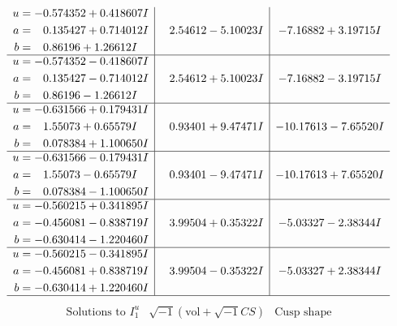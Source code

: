 \documentclass[1p]{elsarticle_modified}
\theoremstyle{definition}
\newcommand{\I}{\sqrt{-1}}
\begin{document}
$$\begin{array}{c|c|c}
\begin{aligned}
u &= -0.574352 + 0.418607 I \\
a &= \phantom{-}0.135427 + 0.714012 I \\
b &= \phantom{-}0.86196 + 1.26612 I\end{aligned}
 & \phantom{-}2.54612 - 5.10023 I & -7.16882 + 3.19715 I \\ \hline\begin{aligned}
u &= -0.574352 - 0.418607 I \\
a &= \phantom{-}0.135427 - 0.714012 I \\
b &= \phantom{-}0.86196 - 1.26612 I\end{aligned}
 & \phantom{-}2.54612 + 5.10023 I & -7.16882 - 3.19715 I \\ \hline\begin{aligned}
u &= -0.631566 + 0.179431 I \\
a &= \phantom{-}1.55073 + 0.65579 I \\
b &= \phantom{-}0.078384 + 1.100650 I\end{aligned}
 & \phantom{-}0.93401 + 9.47471 I & -10.17613 - 7.65520 I \\ \hline\begin{aligned}
u &= -0.631566 - 0.179431 I \\
a &= \phantom{-}1.55073 - 0.65579 I \\
b &= \phantom{-}0.078384 - 1.100650 I\end{aligned}
 & \phantom{-}0.93401 - 9.47471 I & -10.17613 + 7.65520 I \\ \hline\begin{aligned}
u &= -0.560215 + 0.341895 I \\
a &= -0.456081 - 0.838719 I \\
b &= -0.630414 - 1.220460 I\end{aligned}
 & \phantom{-}3.99504 + 0.35322 I & -5.03327 - 2.38344 I \\ \hline\begin{aligned}
u &= -0.560215 - 0.341895 I \\
a &= -0.456081 + 0.838719 I \\
b &= -0.630414 + 1.220460 I\end{aligned}
 & \phantom{-}3.99504 - 0.35322 I & -5.03327 + 2.38344 I\\
 \hline 
 \end{array}$$\newpage$$\begin{array}{c|c|c}  
\text{Solutions to }I^u_{1}& \I (\text{vol} + \sqrt{-1}CS) & \text{Cusp shape}\\
 \hline 
\begin{aligned}

\end{aligned}
\end{array}$$
\end{document}
